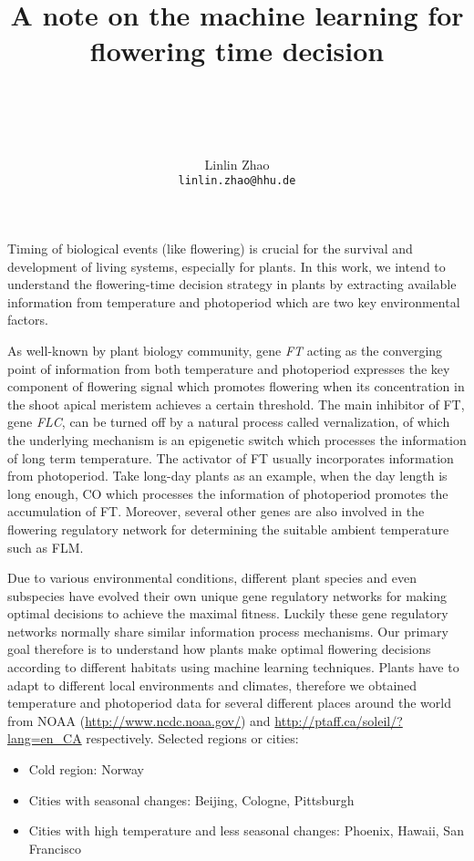 \documentclass[paper=a4, fontsize=12pt]{scrartcl}	%
\title{ \vspace{-1in} 	\usefont{OT1}{bch}{b}{n}
		\huge \strut A note on the machine learning for flowering time decision \strut \\
		\Large \bfseries \strut \strut
}
\author{ 									\usefont{OT1}{bch}{m}{n}
        Linlin Zhao\\		\usefont{OT1}{bch}{m}{n}
        \texttt{linlin.zhao@hhu.de}
}
\date{}
\numberwithin{equation}{section}					%
\numberwithin{figure}{section}					%
\numberwithin{table}{section}					%
\begin{document}
\maketitle

Timing of biological events (like flowering) is crucial for the survival and development of living systems, especially for plants. In this work, we intend to understand the flowering-time decision strategy in plants by extracting available information from temperature and photoperiod which are two key environmental factors. 

As well-known by plant biology community, gene \emph{FT} acting as the converging point of information from both temperature and photoperiod expresses the key component of flowering signal which promotes flowering when its concentration in the shoot apical meristem achieves a certain threshold. The main inhibitor of FT, gene \emph{FLC}, can be turned off by a natural process called vernalization, of which the underlying mechanism is an epigenetic switch which processes the information of long term temperature. The activator of FT usually incorporates information from photoperiod. Take long-day plants as an example, when the day length is long enough, CO which processes the information of photoperiod promotes the accumulation of FT. Moreover, several other genes are also involved in the flowering regulatory network for determining the suitable ambient temperature such as FLM. 

Due to various environmental conditions, different plant species and even subspecies have evolved their own unique gene regulatory networks for making optimal decisions to achieve the maximal fitness. Luckily these gene regulatory networks normally share similar information process mechanisms. Our primary goal therefore is to understand how plants make optimal flowering decisions according to different habitats using machine learning techniques. 
Plants have to adapt to different local environments and climates, therefore we obtained temperature and photoperiod data for several different places around the world from NOAA (\url{http://www.ncdc.noaa.gov/}) and \url{http://ptaff.ca/soleil/?lang=en_CA} respectively. Selected regions or cities: 

\begin{itemize}
\item Cold region: Norway
\item Cities with seasonal changes: Beijing, Cologne, Pittsburgh
\item Cities with high temperature and less seasonal changes: Phoenix, Hawaii, San Francisco
\end{itemize}
\end{document}
